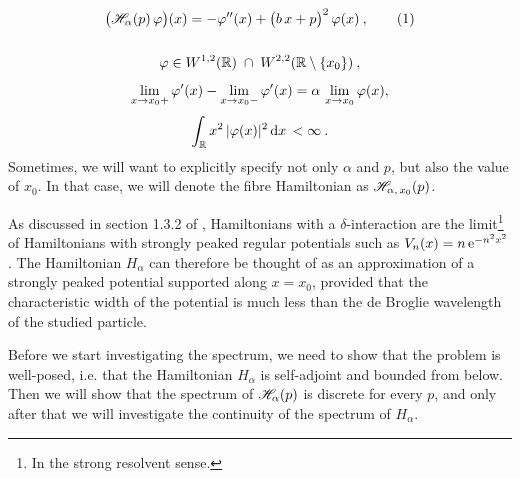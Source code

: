 \begin{gather*}
    \big( \Hf_\alpha(p) \, \varphi \big)(x)
    = -\varphi''(x)
    + \big( b \, x + p \big)^2 \, \varphi(x) \: ,
    \numberthis\label{eqn-dirac-fibre-hamiltonian}
    \\[15pt]
    \varphi \in W^{1,2}(\R) \; \cap \; W^{2,2}( \R \setminus \{ x_0 \}) \: ,
    \\[5pt]
    \lim_{x \to x_0+} \varphi'(x) - \lim_{x \to x_0-} \varphi'(x) = \alpha \, \lim_{x \to x_0} \varphi(x),
    \\[3pt]
    \int_\R x^2 \, |\varphi(x)|^2 \d{x} < \infty \: .
\end{gather*}
Sometimes, we will want to explicitly specify not only $\alpha$ and $p$, but also the value of $x_0$. In that case, we will denote the fibre Hamiltonian as $\mathscr{H}_{\alpha, \, x_0}(p)$.

\medskip

As discussed in section 1.3.2 of \cite{Albeverio2005}, Hamiltonians with a $\delta$-interaction are the limit\footnote{In the strong resolvent sense.} of Hamiltonians with strongly peaked regular potentials such as $V_n(x) = n \, \mathrm{e}^{-n^2 x^2}$. The Hamiltonian $H_\alpha$ can therefore be thought of as an approximation of a strongly peaked potential supported along $x = x_0$, provided that the characteristic width of the potential is much less than the de Broglie wavelength of the studied particle.

Before we start investigating the spectrum, we need to show that the problem is well-posed, i.e. that the Hamiltonian $H_\alpha$ is self-adjoint and bounded from below. Then we will show that the spectrum of $\mathscr{H}_\alpha(p)$ is discrete for every $p$, and only after that we will investigate the continuity of the spectrum of $H_\alpha$.

